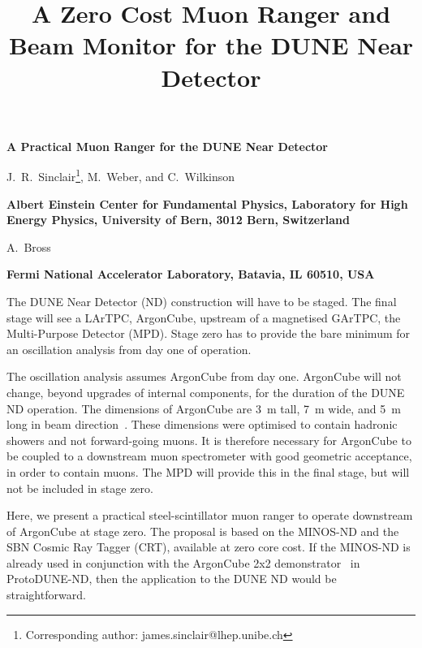 \documentclass[a4paper]{article}
\title{A Zero Cost Muon Ranger and Beam Monitor for the DUNE Near Detector}%
\begin{document}
\begin{center}
	
	{\Large \bf A Practical Muon Ranger for the DUNE Near Detector} 
	\vspace*{0.5cm}
	\setcounter{footnote}{0}  
	\def\A{\kern+.6ex\lower.42ex\hbox{$\scriptstyle \iota$}\kern-1.20ex a}
	\def\E{\kern+.5ex\lower.42ex\hbox{$\scriptstyle \iota$}\kern-1.10ex e}
	\small
	\newcommand{\Aname}[2]{#1}
	\def\titlefoot#1{\vspace{-0.01cm}\begin{center}{\bf #1}\end{center}}
	
	\Aname{J.~R.~Sinclair\footnote{Corresponding author: james.sinclair@lhep.unibe.ch}}{Bern},
	\Aname{M.~Weber}{Bern}, and 
	\Aname{C.~Wilkinson}{Bern}
	\titlefoot{Albert Einstein Center for Fundamental Physics, Laboratory for High Energy Physics, University of Bern, 3012 Bern, Switzerland\label{Bern}}
	
	\Aname{A.~Bross}{FNAL}
	\titlefoot{Fermi National Accelerator Laboratory, Batavia, IL 60510, USA\label{FNAL}}
	
\end{center}


The DUNE Near Detector (ND) construction will have to be staged. 
The final stage will see a LArTPC, ArgonCube, upstream of a magnetised GArTPC, the Multi-Purpose Detector (MPD).  
Stage zero has to provide the bare minimum for an oscillation analysis from day one of operation.

The oscillation analysis assumes ArgonCube from day one. 
ArgonCube will not change, beyond upgrades of internal components, for the duration of the DUNE ND operation.
The dimensions of ArgonCube are \SI{3}{\metre} tall, \SI{7}{\metre} wide, and \SI{5}{\metre} long in beam direction~\cite{LAr_size}.
These dimensions were optimised to contain hadronic showers and not forward-going muons. 
It is therefore necessary for ArgonCube to be coupled to a downstream muon spectrometer with good geometric acceptance, in order to contain muons.
The MPD will provide this in the final stage, but will not be included in stage zero.

Here, we present a practical steel-scintillator muon ranger to operate downstream of ArgonCube at stage zero.   
The proposal is based on the MINOS-ND and the SBN Cosmic Ray Tagger (CRT), available at zero core cost.
If the MINOS-ND is already used in conjunction with the ArgonCube 2x2 demonstrator~\cite{2x2} in ProtoDUNE-ND, then the application to the DUNE ND would be straightforward.
\end{document}
